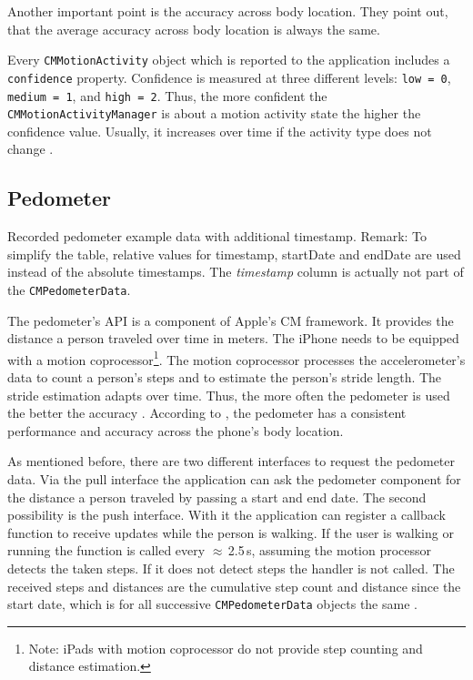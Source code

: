 Another important point is the accuracy across body location. They point out, that the average accuracy across body location is always the same.

Every \texttt{CMMotionActivity} object which is reported to the application includes a \texttt{confidence} property. Confidence is measured at three different levels: \texttt{low\,=\,0}, \texttt{medium\,=\,1}, and \texttt{high\,=\,2}. Thus, the more confident the \texttt{CMMotionActivityManager} is about a motion activity state the higher the confidence value. Usually, it increases over time if the activity type does not change \citep{apple:wwdc_2014_pham,apple:ios_doc_cm}.


\subsection{Pedometer}
\begin{table}
	
	\caption{Recorded pedometer example data with additional timestamp. Remark: To simplify the table, relative values for timestamp, startDate and endDate are used instead of the absolute timestamps. The \emph{timestamp} column is actually not part of the \texttt{CMPedometerData}.}
	\label{tab:pedometerExampleData}
\end{table}

The pedometer's \acs{API} is a component of Apple's \acs{CM} framework. It provides the distance a person traveled over time in meters. The iPhone needs to be equipped with a motion coprocessor\footnote{Note: iPads with motion coprocessor do not provide step counting and distance estimation.}. The motion coprocessor processes the accelerometer's data to count a person's steps and to estimate the person's stride length. The stride estimation adapts over time. Thus, the more often the pedometer is used the better the accuracy \citep{apple:wwdc_2014_pham}. According to \citet{apple:wwdc_2014_pham}, the pedometer has a consistent performance and accuracy across the phone's body location.

As mentioned before, there are two different interfaces to request the pedometer data. Via the pull interface the application can ask the pedometer component for the distance a person traveled by passing a start and end date. The second possibility is the push interface. With it the application can register a callback function to receive updates while the person is walking. If the user is walking or running the function is called every $\approx$\,2.5\,s, assuming the motion processor detects the taken steps. If it does not detect steps the handler is not called. The received steps and distances are the cumulative step count and distance since the start date, which is for all successive \texttt{CMPedometerData} objects the same \citep{apple:wwdc_2014_pham}.

